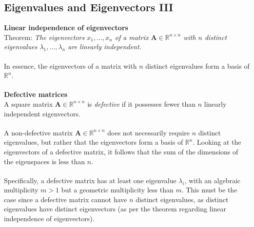 \documentclass{report}
\begin{document}
\subsection{Eigenvalues and Eigenvectors III} %
\textbf{Linear independence of eigenvectors}\\
Theorem: \textit{The eigenvectors $x_1,\ldots,x_n$ of a
matrix $\bm{A}\in\mathbb{R}^{n\times n}$ with $n$ distinct eigenvalues $\lambda_1,\ldots,\lambda_n$ are 
linearly independent.}\\
\vspace{1mm}\\
In essence, the eigenvectors of a matrix with $n$ distinct eigenvalues form a basis of $\mathbb{R}^n$.\\
\vspace{1mm}\\
\textbf{Defective matrices}\\
A square matrix $\bm{A}\in\mathbb{R}^{n\times n}$ is \textit{defective} if it possesses fewer than $n$
linearly independent eigenvectors.\\
\vspace{1mm}\\
A non-defective matrix $\bm{A}\in\mathbb{R}^{n\times n}$ does not necessarily require $n$ distinct eigenvalues,
but rather that the eigenvectors form a basis of $\mathbb{R}^n$. Looking at the eigenvectors of a defective
matrix, it follows that the sum of the dimensions of the eigenspaces is less than $n$.\\
\vspace{1mm}\\
Specifically, a defective matrix has at least one eigenvalue $\lambda_i$, with an algebraic multiplicity $m>1$ but a
geometric multiplicity less than $m$.
This must be the case since a defective matrix cannot have $n$ distinct eigenvalues, 
as distinct eigenvalues have distinct eigenvectors (as per the theorem regarding linear independence of
eigenvectors).
\newpage
\end{document}
